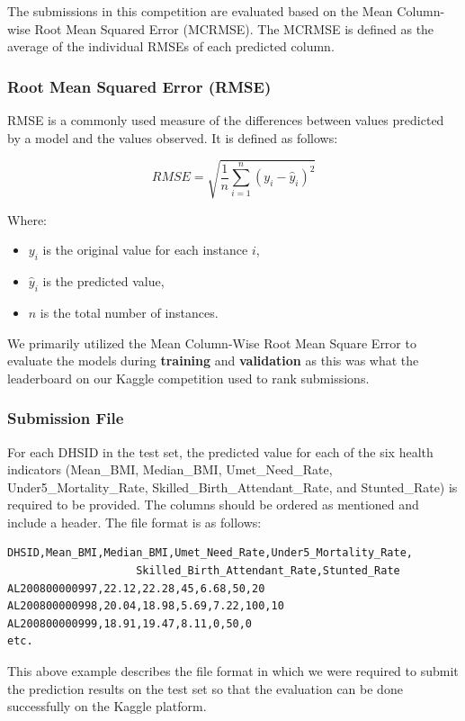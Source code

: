 \documentclass{article}
\begin{document}
The submissions in this competition are evaluated based on the Mean Column-wise Root Mean Squared Error (MCRMSE). The MCRMSE is defined as the average of the individual RMSEs of each predicted column.

\subsubsection{Root Mean Squared Error (RMSE)}

RMSE is a commonly used measure of the differences between values predicted by a model and the values observed. It is defined as follows:

\[
RMSE = \sqrt{\frac{1}{n}\sum_{i=1}^{n}(y_{i} - \hat{y}_{i})^{2}}
\]

Where:

\begin{itemize}
\item $y_{i}$ is the original value for each instance $i$,
\item $\hat{y}_{i}$ is the predicted value,
\item $n$ is the total number of instances.
\end{itemize}

We primarily utilized the Mean Column-Wise Root Mean Square Error to evaluate the models during \textbf{training} and \textbf{validation} as this was what the leaderboard on our Kaggle competition used to rank submissions.

\subsubsection{Submission File}

For each DHSID in the test set, the predicted value for each of the six health indicators (Mean\_BMI, Median\_BMI, Umet\_Need\_Rate, Under5\_Mortality\_Rate, Skilled\_Birth\_Attendant\_Rate, and Stunted\_Rate) is required to be provided. The columns should be ordered as mentioned and include a header. The file format is as follows:

\begin{verbatim}
DHSID,Mean_BMI,Median_BMI,Umet_Need_Rate,Under5_Mortality_Rate,
                    Skilled_Birth_Attendant_Rate,Stunted_Rate
AL200800000997,22.12,22.28,45,6.68,50,20
AL200800000998,20.04,18.98,5.69,7.22,100,10
AL200800000999,18.91,19.47,8.11,0,50,0
etc.
\end{verbatim}

This above example describes the file format in which we were required to submit the prediction results on the test set so that the evaluation can be done successfully on the Kaggle platform.
\end{document}
